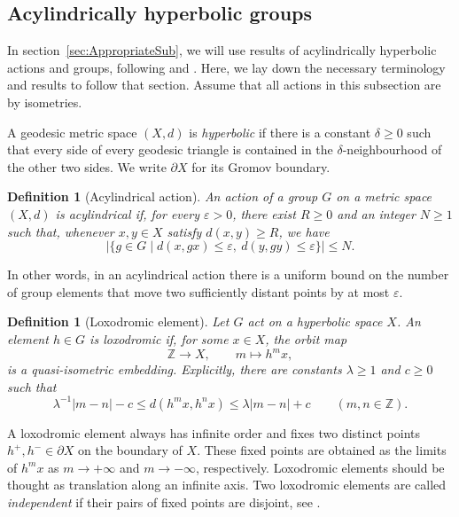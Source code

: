\documentclass[10pt,a4paper]{amsart}
\newtheorem{definition}[prop]{Definition}
\newcommand{\ZZ}{\mathbb{Z}}
\begin{document}
\subsection{Acylindrically hyperbolic groups} \label{sec:AcylindricallyHyperbolic}

In section~\ref{sec:AppropriateSub}, we will use results of acylindrically hyperbolic actions and groups, following 
\cite[Sections~1 and~2]{OsinAcylindrical} and
\cite[Section~6.1]{DGO}. Here, we lay down the necessary terminology and results to follow that section. Assume that all actions in this subsection are by isometries.

A geodesic metric space $(X,d)$ is \emph{hyperbolic} if there is a constant
$\delta\geq0$ such that every side of every geodesic triangle is contained
in the $\delta$-neighbourhood of the other two sides.  We write $\partial X$
for its Gromov boundary.

\begin{definition}[Acylindrical action]
\label{def:acylindrical}
An action of a group $G$ on a metric space $(X,d)$ is \emph{acylindrical} if,
for every $\varepsilon>0$, there exist $R\geq0$ and an integer $N\geq1$ such
that, whenever $x,y\in X$ satisfy $d(x,y)\geq R$, we have
\[
    \bigl|\{g\in G\mid d(x,gx)\leq\varepsilon,
                       \ d(y,gy)\leq\varepsilon\}\bigr|\leq N.
\]

\end{definition}
In other words, in an acylindrical action there is a uniform bound on the number of group elements that move
two sufficiently distant points by at most $\varepsilon$.
\begin{definition}[Loxodromic element]
\label{def:loxodromic}
Let $G$ act on a hyperbolic space $X$.  An element $h\in G$ is
\emph{loxodromic} if, for some $x\in X$, the orbit map
\[
    \ZZ\longrightarrow X,\qquad m\longmapsto h^m x,
\]
is a quasi-isometric embedding.  Explicitly, there are constants
$\lambda\geq1$ and $c\geq0$ such that
\[
    \lambda^{-1}|m-n|-c
    \leq d(h^m x,h^n x)
    \leq\lambda|m-n|+c
    \qquad(m,n\in\ZZ).
\]

\end{definition}

A loxodromic element always has infinite order and fixes two distinct points
$h^+,h^-\in\partial X$ on the boundary of $X$. These fixed points are obtained as the limits of $h^m x$ as
$m\to+\infty$ and $m\to-\infty$, respectively. Loxodromic elements should be thought as translation along an infinite axis.  Two loxodromic elements
are called \emph{independent} if their pairs of fixed points are disjoint,
see \cite[Section~1]{OsinAcylindrical}.
\end{document}
